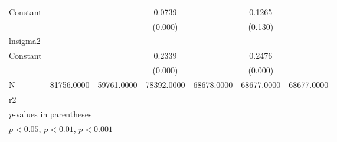 {\begin{tabular}{l*{6}{c}}
Constant            &                     &                     &      0.0739\sym{***}&                     &      0.1265         &                     \\
                    &                     &                     &     (0.000)         &                     &     (0.130)         &                     \\
\hline
lnsigma2            &                     &                     &                     &                     &                     &                     \\
Constant            &                     &                     &      0.2339\sym{***}&                     &      0.2476\sym{***}&                     \\
                    &                     &                     &     (0.000)         &                     &     (0.000)         &                     \\
\hline
N                   &  81756.0000         &  59761.0000         &  78392.0000         &  68678.0000         &  68677.0000         &  68677.0000         \\
r2                  &                     &                     &                     &                     &                     &                     \\
\hline\hline
\multicolumn{7}{l}{\footnotesize \textit{p}-values in parentheses}\\
\multicolumn{7}{l}{\footnotesize \sym{*} \(p<0.05\), \sym{**} \(p<0.01\), \sym{***} \(p<0.001\)}\\
\end{tabular}
}
